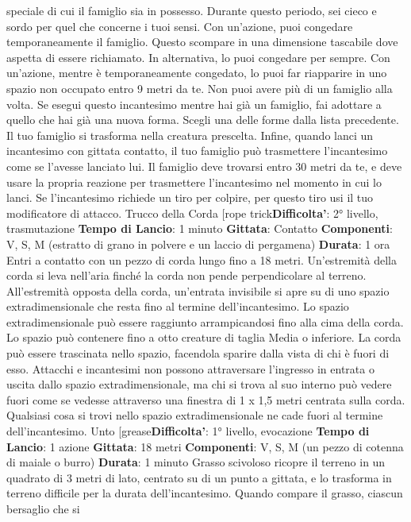 \begin{multicols}{2}
speciale di cui il famiglio sia in possesso. Durante
questo periodo, sei cieco e sordo per quel che
concerne i tuoi sensi.
Con un’azione, puoi congedare temporaneamente il
famiglio. Questo scompare in una dimensione tascabile
dove aspetta di essere richiamato. In alternativa, lo puoi
congedare per sempre. Con un’azione, mentre è
temporaneamente congedato, lo puoi far riapparire in
uno spazio non occupato entro 9 metri da te.
Non puoi avere più di un famiglio alla volta. Se esegui
questo incantesimo mentre hai già un famiglio, fai
adottare a quello che hai già una nuova forma. Scegli
una delle forme dalla lista precedente. Il tuo famiglio si
trasforma nella creatura prescelta.
Infine, quando lanci un incantesimo con gittata contatto,
il tuo famiglio può trasmettere l’incantesimo come se
l’avesse lanciato lui. Il famiglio deve trovarsi entro 30
metri da te, e deve usare la propria reazione per
trasmettere l’incantesimo nel momento in cui lo lanci.
Se l’incantesimo richiede un tiro per colpire, per questo
tiro usi il tuo modificatore di attacco.
Trucco della Corda
[rope trick\textbf{Difficolta'}:
2° livello, trasmutazione
\textbf{Tempo di Lancio}: 1 minuto
\textbf{Gittata}: Contatto
\textbf{Componenti}: V, S, M (estratto di grano in polvere e un
laccio di pergamena)
\textbf{Durata}: 1 ora
Entri a contatto con un pezzo di corda lungo fino a 18
metri. Un’estremità della corda si leva nell’aria finché la
corda non pende perpendicolare al terreno.
All’estremità opposta della corda, un’entrata invisibile si
apre su di uno spazio extradimensionale che resta fino
al termine dell’incantesimo.
Lo spazio extradimensionale può essere raggiunto
arrampicandosi fino alla cima della corda. Lo spazio
può contenere fino a otto creature di taglia Media o
inferiore. La corda può essere trascinata nello spazio,
facendola sparire dalla vista di chi è fuori di esso.
Attacchi e incantesimi non possono attraversare
l’ingresso in entrata o uscita dallo spazio
extradimensionale, ma chi si trova al suo interno può
vedere fuori come se vedesse attraverso una finestra di
1 x 1,5 metri centrata sulla corda.
Qualsiasi cosa si trovi nello spazio extradimensionale
ne cade fuori al termine dell’incantesimo.
Unto
[grease\textbf{Difficolta'}:
1° livello, evocazione
\textbf{Tempo di Lancio}: 1 azione
\textbf{Gittata}: 18 metri
\textbf{Componenti}: V, S, M (un pezzo di cotenna di maiale o
burro)
\textbf{Durata}: 1 minuto
Grasso scivoloso ricopre il terreno in un quadrato di 3
metri di lato, centrato su di un punto a gittata, e lo
trasforma in terreno difficile per la durata
dell’incantesimo.
Quando compare il grasso, ciascun bersaglio che si

\end{multicols}
